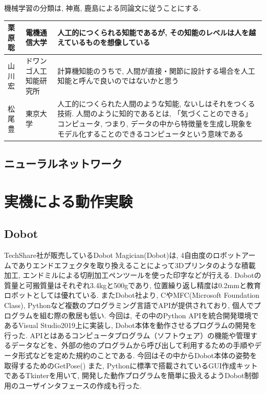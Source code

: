 \documentclass{suribt}
\begin{document}
機械学習の分類は, 神嶌, 鹿島による同論文に従うことにする. 

\begin{table}[htb]
	\begin{tabular}{l|l|p{7cm}}
		\hline
		栗原聡 & 電機通信大学 & 人工的につくられる知能であるが, その知能のレベルは人を越えているものを想像している \\ \hline
		山川宏 & ドワンゴ人工知能研究所 & 計算機知能のうちで, 人間が直接・関節に設計する場合を人工知能と呼んで良いのではないかと思う \\ \hline
		松尾豊 & 東京大学 & 人工的につくられた人間のような知能, ないしはそれをつくる技術. 人間のように知的であるとは, 「気づくことのできる」コンピュータ, つまり, データの中から特徴量を生成し現象をモデル化することのできるコンピュータという意味である \\
		\hline
	\end{tabular}
\end{table}


\section{ニューラルネットワーク}



\chapter{実機による動作実験}

\section{Dobot}
TechShare社が販売しているDobot Magician(Dobot)は, 4自由度のロボットアームでありエンドエフェクタを取り換えることによって3Dプリンタのような積載加工, エンドミルによる切削加工ペンツールを使った印字などが行える. 
Dobotの質量と可搬質量はそれぞれ3.4kgと500gであり, 位置繰り返し精度は0.2mmと教育ロボットとしては優れている. 
またDobot社より, CやMFC(Microsoft Foundation Class), Pythonなど複数のプログラミング言語でAPIが提供されており, 個人でプログラムを組む際の敷居も低い. 
今回は, その中のPython APIを統合開発環境であるVisual Studio2019上に実装し, Dobot本体を動作させるプログラムの開発を行った. APIとはあるコンピュータプログラム（ソフトウェア）の機能や管理するデータなどを、外部の他のプログラムから呼び出して利用するための手順やデータ形式などを定めた規約のことである. 
今回はその中からDobot本体の姿勢を取得するためのGetPose()
また, Pythonに標準で搭載されているGUI作成キットであるTkinterを用いて, 開発した動作プログラムを簡単に扱えるようDobot制御用のユーザインタフェースの作成も行った. 
\end{document}
